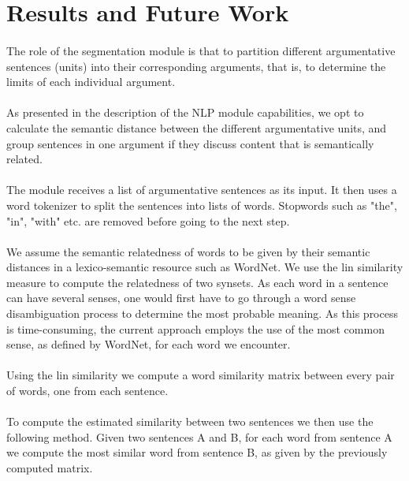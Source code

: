 
\section{Results and Future Work}
\label{sec:results}

\paragraph*{}The role of the segmentation module is that to partition different argumentative sentences (units) into their corresponding arguments, that is, to determine the limits of each individual argument.
\paragraph*{}As presented in the description of the NLP module capabilities, we opt to calculate the semantic distance between the different argumentative units, and group sentences in one argument if they discuss content that is semantically related.
\paragraph*{}The module receives a list of argumentative sentences as its input. It then uses a word tokenizer to split the sentences into lists of words. Stopwords such as "the", "in", "with" etc. are removed before going to the next step.
\paragraph*{}We assume the semantic relatedness of words to be given by their semantic distances in a lexico-semantic resource such as WordNet. We use the lin similarity measure to compute the relatedness of two synsets. As each word in a sentence can have several senses, one would first have to go through a word sense disambiguation process to determine the most probable meaning. As this process is time-consuming, the current approach employs the use of the most common sense, as defined by WordNet, for each word we encounter.
\paragraph*{}Using the lin similarity we compute a word similarity matrix between every pair of words, one from each sentence.
\paragraph*{}To compute the estimated similarity between two sentences we then use the following method. Given two sentences A and B, for each word from sentence A we compute the most similar word from sentence B, as given by the previously computed matrix.

